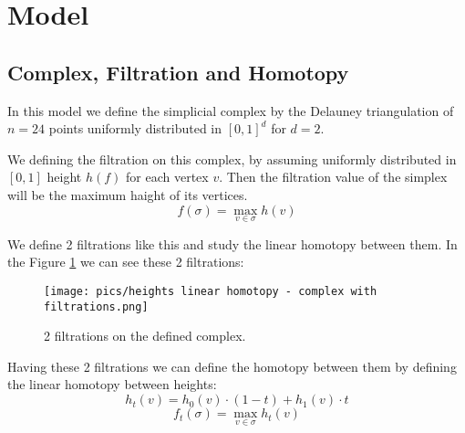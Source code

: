 \documentclass{article}
\begin{document}
\tableofcontents
\newpage

\section{Model}
\subsection{Complex, Filtration and Homotopy}
\par In this model we define the simplicial complex by the Delauney triangulation of $n = 24$ points uniformly distributed in $[0, 1]^d$ for $d = 2$.
\par We defining the filtration on this complex, by assuming uniformly distributed in $[0, 1]$ height $h(f)$ for each vertex $v$. Then the filtration value of the simplex will be the maximum haight of its vertices.
$$
    f(\sigma) = \max_{v\in \sigma} h(v)
$$
\par We define 2 filtrations like this and study the linear homotopy between them. In the Figure \ref{fig:complex} we can see these 2 filtrations:
\begin{figure}[h!]
    \centering
    \texttt{[image: pics/heights linear homotopy - complex with filtrations.png]}
    \caption{2 filtrations on the defined complex.}
    \label{fig:complex}
\end{figure}

\par Having these 2 filtrations we can define the homotopy between them by defining the linear homotopy between heights:
$$
    h_t(v) = h_0(v)\cdot(1 - t) + h_1(v)\cdot t
$$
$$
    f_t(\sigma) = \max_{v\in \sigma} h_t(v)
$$
\end{document}
